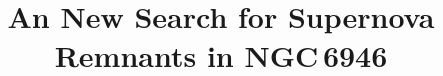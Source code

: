 %


\usepackage{natbib}
\usepackage{comment}
\usepackage{todonotes}
\usepackage{graphicx}



\title{An New Search for Supernova Remnants in NGC\,6946}



